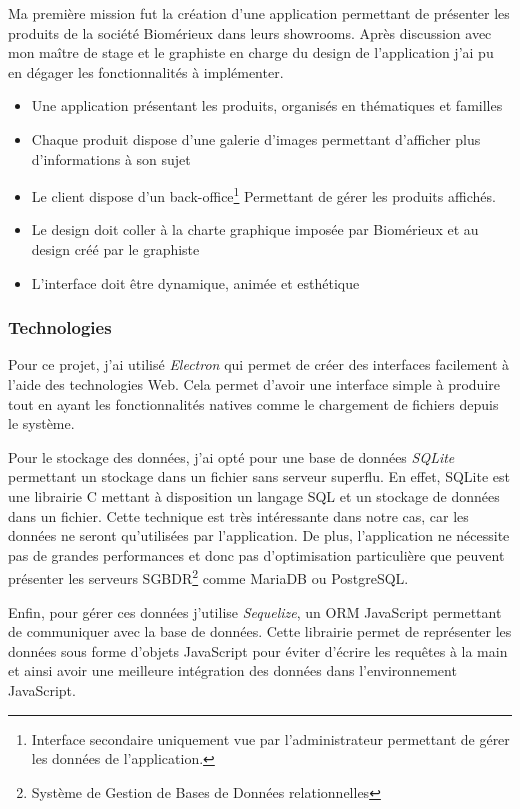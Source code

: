 \documentclass{article}
\begin{document}
Ma première mission fut la création d'une application permettant de présenter les produits de la société Biomérieux dans leurs showrooms.
Après discussion avec mon maître de stage et le graphiste en charge du design de l'application j'ai pu en dégager les fonctionnalités à implémenter.

\medskip

\begin{itemize}
    \item Une application présentant les produits, organisés en thématiques et familles
    \item Chaque produit dispose d'une galerie d'images permettant d'afficher plus d'informations à son sujet
    \item Le client dispose d'un back-office\footnote{Interface secondaire uniquement vue par l'administrateur permettant de gérer les données de l'application.} Permettant de gérer les produits affichés.
    \item Le design doit coller à la charte graphique imposée par Biomérieux et au design créé par le graphiste
    \item L'interface doit être dynamique, animée et esthétique
\end{itemize}

\subsubsection{Technologies}

Pour ce projet, j'ai utilisé \emph{Electron} qui permet de créer des interfaces facilement à l'aide des technologies Web.
Cela permet d'avoir une interface simple à produire tout en ayant les fonctionnalités natives comme le chargement de fichiers depuis le système.

Pour le stockage des données, j'ai opté pour une base de données \emph{SQLite} permettant un stockage dans un fichier sans serveur superflu.
En effet, SQLite est une librairie C mettant à disposition un langage SQL et un stockage de données dans un fichier.
Cette technique est très intéressante dans notre cas, car les données ne seront qu'utilisées par l'application.
De plus, l'application ne nécessite pas de grandes performances et donc pas d'optimisation particulière que peuvent présenter les serveurs SGBDR\footnote{Système de Gestion de Bases de Données relationnelles} comme MariaDB ou PostgreSQL\@.

Enfin, pour gérer ces données j'utilise \emph{Sequelize}, un ORM JavaScript permettant de communiquer avec la base de données.
Cette librairie permet de représenter les données sous forme d'objets JavaScript pour éviter d'écrire les requêtes à la main et ainsi avoir une meilleure intégration des données dans l'environnement JavaScript.
\end{document}
